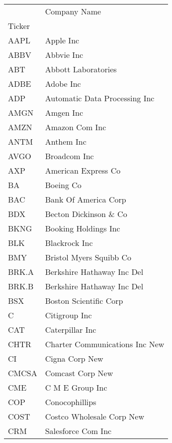 \begin{tabular}{ll}
\toprule
{} &                      Company Name \\
Ticker &                                   \\
\midrule
AAPL   &                         Apple Inc \\
ABBV   &                        Abbvie Inc \\
ABT    &               Abbott Laboratories \\
ADBE   &                         Adobe Inc \\
ADP    &     Automatic Data Processing Inc \\
AMGN   &                         Amgen Inc \\
AMZN   &                    Amazon Com Inc \\
ANTM   &                        Anthem Inc \\
AVGO   &                      Broadcom Inc \\
AXP    &               American Express Co \\
BA     &                         Boeing Co \\
BAC    &              Bank Of America Corp \\
BDX    &            Becton Dickinson \& Co \\
BKNG   &              Booking Holdings Inc \\
BLK    &                     Blackrock Inc \\
BMY    &           Bristol Myers Squibb Co \\
BRK.A  &        Berkshire Hathaway Inc Del \\
BRK.B  &        Berkshire Hathaway Inc Del \\
BSX    &            Boston Scientific Corp \\
C      &                     Citigroup Inc \\
CAT    &                   Caterpillar Inc \\
CHTR   &    Charter Communications Inc New \\
CI     &                    Cigna Corp New \\
CMCSA  &                  Comcast Corp New \\
CME    &                   C M E Group Inc \\
COP    &                    Conocophillips \\
COST   &         Costco Wholesale Corp New \\
CRM    &                Salesforce Com Inc \\

\end{tabular}
